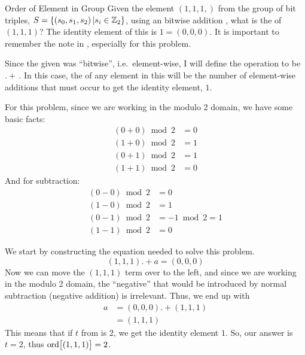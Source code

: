\begin{example}{Order of Element in Group}
  Given the element $(1, 1, 1,)$ from the group of bit triples, $S = \lbrace \left( s_{0}, s_{1}, s_{2} \right) \vert s_{i} \in \operatorname{\mathbb{Z}}_{2} \rbrace$, using an bitwise addition , what is the  of $(1, 1, 1)$?
  The identity element of this  is $1 = (0, 0, 0)$.
  \tcblower{}
  It is important to remember the note in , especially for this problem.

  Since the given  was ``bitwise'', i.e.\ element-wise, I will define the operation to be $.+\,$.
  In this case, the  of any element in this  will be the number of element-wise additions that must occur to get the identity element, $1$.

  For this problem, since we are working in the modulo 2 domain, we have some basic facts:
  \begin{align*}
    (0 + 0) \bmod 2 &= 0 \\
    (1 + 0) \bmod 2 &= 1 \\
    (0 + 1) \bmod 2 &= 1 \\
    (1 + 1) \bmod 2 &= 0
  \end{align*}
  And for subtraction:
  \begin{align*}
    (0 - 0) \bmod 2 &= 0 \\
    (1 - 0) \bmod 2 &= 1 \\
    (0 - 1) \bmod 2 &= -1 \bmod 2 = 1 \\
    (1 - 1) \bmod 2 &= 0
  \end{align*}

  We start by constructing the equation needed to solve this problem.
  \begin{equation*}
    (1, 1, 1) .+ a = (0, 0, 0)
  \end{equation*}
  Now we can move the $(1, 1, 1)$ term over to the left, and since we are working in the modulo 2 domain, the ``negative'' that would be introduced by normal subtraction (negative addition) is irrelevant.
  Thus, we end up with
  \begin{align*}
    a &= (0, 0, 0) .+ (1, 1, 1) \\
      &= (1, 1, 1)
  \end{align*}
  This means that if $t$ from  is 2, we get the identity element $1$.
  So, our answer is $t = 2$, thus $\operatorname{\text{ord}} \bigl[ (1, 1, 1) \bigr] = 2$.
\end{example}

